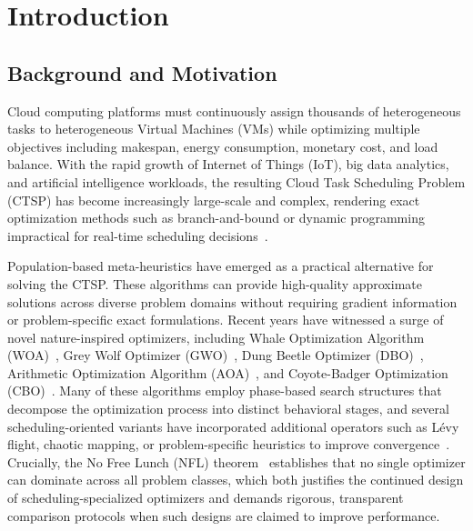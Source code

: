 \documentclass[pdflatex,onecolumn,sn-mathphys-num]{sn-jnl}
\begin{document}
\maketitle

\section{Introduction}\label{sec1}

\subsection{Background and Motivation}
Cloud computing platforms must continuously assign thousands of heterogeneous tasks to heterogeneous Virtual Machines (VMs) while optimizing multiple objectives including makespan, energy consumption, monetary cost, and load balance. With the rapid growth of Internet of Things (IoT), big data analytics, and artificial intelligence workloads, the resulting Cloud Task Scheduling Problem (CTSP) has become increasingly large-scale and complex, rendering exact optimization methods such as branch-and-bound or dynamic programming impractical for real-time scheduling decisions~\cite{Braun2001,Etminani2007}.

Population-based meta-heuristics have emerged as a practical alternative for solving the CTSP. These algorithms can provide high-quality approximate solutions across diverse problem domains without requiring gradient information or problem-specific exact formulations. Recent years have witnessed a surge of novel nature-inspired optimizers, including Whale Optimization Algorithm (WOA)~\cite{Mirjalili2016}, Grey Wolf Optimizer (GWO)~\cite{Mirjalili2014}, Dung Beetle Optimizer (DBO)~\cite{Xue2022}, Arithmetic Optimization Algorithm (AOA)~\cite{Abualigah2021}, and Coyote-Badger Optimization (CBO)~\cite{Khatab2025}. Many of these algorithms employ phase-based search structures that decompose the optimization process into distinct behavioral stages, and several scheduling-oriented variants have incorporated additional operators such as L\'{e}vy flight, chaotic mapping, or problem-specific heuristics to improve convergence~\cite{Chintale2024,Sabipour2025,Zhu2025,Xie2024}. Crucially, the No Free Lunch (NFL) theorem~\cite{Wolpert1997} establishes that no single optimizer can dominate across all problem classes, which both justifies the continued design of scheduling-specialized optimizers and demands rigorous, transparent comparison protocols when such designs are claimed to improve performance.
\end{document}
